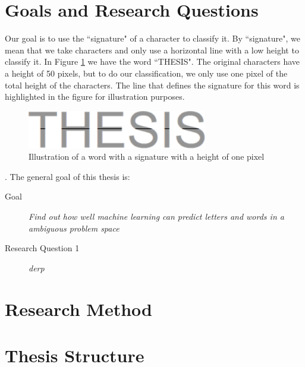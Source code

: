 \section{Goals and Research Questions}
Our goal is to use the ``signature" of a character to classify it. By ``signature", we mean that we take characters and only use a horizontal line with a low height to classify it. In Figure \ref{fig:thesis-signature} we have the word ``THESIS". The original characters have a height of 50 pixels, but to do our classification, we only use one pixel of the total height of the characters. The line that defines the signature for this word is highlighted in the figure for illustration purposes.

\begin{figure}[ht]
    \centering
    \includegraphics[width=0.7\textwidth]{fig/chapter1/signature.png}
    \caption{Illustration of a word with a signature with a height of one pixel}
    \label{fig:thesis-signature}
\end{figure}

. The general goal of this thesis is:

\begin{description}
\item[Goal] {\it Find out how well machine learning can predict letters and words in a ambiguous problem space}
\end{description}


\begin{description}
    \item[Research Question 1]{\it derp}
\end{description}

\section{Research Method}

\section{Thesis Structure}
